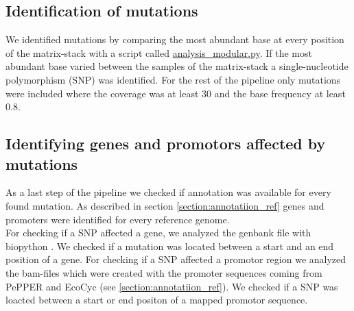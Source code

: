 \subsection{Identification of mutations} 
We identified mutations by comparing the most abundant base at every position of the matrix-stack with a script called \href{https://github.com/nahanoo/ESBL\_project/pileup.py}{analysis\_modular.py}. If the most abundant base varied between the samples of the matrix-stack a single-nucleotide polymorphism (SNP) was identified. For the rest of the pipeline only mutations were included where the coverage was at least 30 and the base frequency at least 0.8.

\subsection{Identifying genes and promotors affected by mutations}
As a last step of the pipeline we checked if annotation was available for every found mutation. As described in section \ref{section:annotatiion_ref} genes and promoters were identified for every reference genome. \\
For checking if a SNP affected a gene, we analyzed the genbank file with biopython \cite{cock_biopython:_2009}. We checked if a mutation was located between a start and an end position of a gene. For checking if a SNP affected a promotor region we analyzed the bam-files which were created with the promoter sequences coming from PePPER and EcoCyc (see \ref{section:annotatiion_ref}). We checked if a SNP was loacted between a start or end positon of a mapped promotor sequence. 